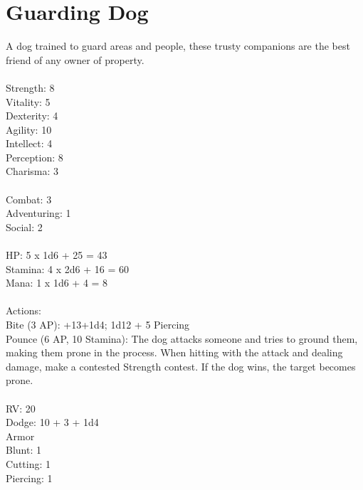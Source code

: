 \section{Guarding Dog}

A dog trained to guard areas and people, these trusty companions are the best friend of any owner of property.\\
\\
Strength: 8\\
Vitality: 5\\
Dexterity: 4\\
Agility: 10\\
Intellect: 4\\
Perception: 8\\
Charisma: 3\\
\\
Combat: 3\\
Adventuring: 1\\
Social: 2\\
\\
HP: 5 x 1d6 + 25 = 43\\
Stamina: 4 x 2d6 + 16 = 60\\
Mana: 1 x 1d6 + 4 = 8\\
\\
Actions:\\
Bite (3 AP): +13+1d4; 1d12 + 5 Piercing\\
Pounce (6 AP, 10 Stamina): The dog attacks someone and tries to ground them, making them prone in the process. When hitting with the attack and dealing damage, make a contested Strength contest. If the dog wins, the target becomes prone.\\
\\
RV: 20\\
Dodge: 10 + 3 + 1d4\\
Armor\\
Blunt: 1\\
Cutting: 1\\
Piercing: 1\\

